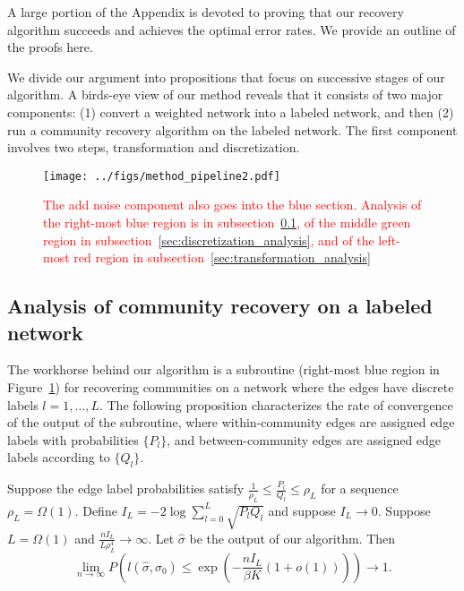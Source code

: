 \documentclass{article}
\begin{document}
A large portion of the Appendix is devoted to proving that our recovery algorithm succeeds and achieves the optimal error rates. We provide an outline of the proofs here.

We divide our argument into propositions that focus on successive stages of our algorithm. A birds-eye view of our method reveals that it consists of two major components: (1) convert a weighted network into a labeled network, and then (2) run a community recovery algorithm on the labeled network. The first component involves two steps, transformation and discretization. 

\begin{figure}[htp]
\centering
\texttt{[image: ../figs/method\_pipeline2.pdf]}
\caption{\textcolor{red}{The add noise component also goes into the blue section. Analysis of the right-most blue region is in subsection~\ref{sec:labeled_sbm_analysis}, of the middle green region in subsection~\ref{sec:discretization_analysis}, and of the left-most red region in subsection~\ref{sec:transformation_analysis}}}
\label{fig:method_pipeline1}
\end{figure}

\subsection{Analysis of community recovery on a labeled network}
\label{sec:labeled_sbm_analysis}

The workhorse behind our algorithm is a subroutine (right-most blue region in Figure~\ref{fig:method_pipeline1}) for recovering communities on a network where the edges have discrete labels $l=1, \dots, L$. The following proposition characterizes the rate of convergence of the output of the subroutine, where within-community edges are assigned edge labels with probabilities $\{P_l\}$, and between-community edges are assigned edge labels according to $\{Q_l\}$. 

\begin{proposition}
\label{prop:labeled_sbm_rate}
Suppose the edge label probabilities satisfy $\frac{1}{\rho_L} \leq \frac{P_l}{Q_l} \leq \rho_L$ for a sequence $\rho_L = \Omega(1)$. Define $I_L = -2 \log \sum_{l=0}^L \sqrt{P_l Q_l}$ and suppose $I_L \rightarrow 0$. Suppose $L = \Omega(1)$ and $\frac{n I_L}{L \rho^4_L} \rightarrow \infty$. Let $\hat{\sigma}$ be the output of our algorithm. Then
\[
\lim_{n \rightarrow \infty} P \left( l(\hat{\sigma}, \sigma_0) \leq \exp \left( - \frac{ n I_L}{ \beta K} (1 + o(1)) \right) \right) \rightarrow 1.
\]
\end{proposition}
\end{document}

